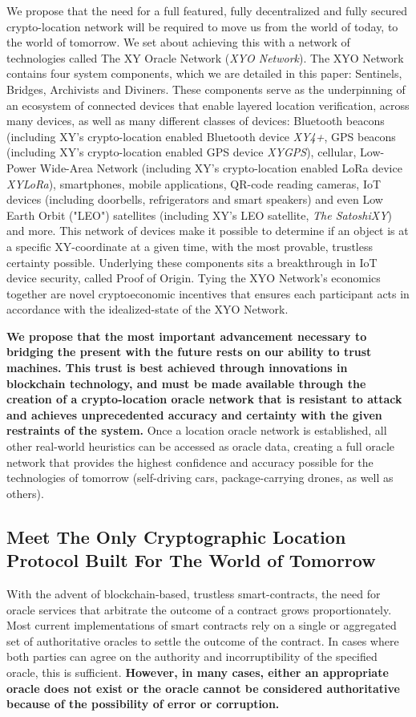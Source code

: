 \documentclass{article}
\begin{document}
We propose that the need for a full featured, fully decentralized and fully secured crypto-location network will be required to move us from the world of today, to the world of tomorrow. We set about achieving this with a network of technologies called The XY Oracle Network (\textit{XYO Network}). The XYO Network contains four system components, which we are detailed in this paper: Sentinels, Bridges, Archivists and Diviners. These components serve as the underpinning of an ecosystem of connected devices that enable layered location verification, across many devices, as well as many different classes of devices: Bluetooth beacons (including XY's crypto-location enabled Bluetooth device \textit{XY4+}, GPS beacons (including XY's crypto-location enabled GPS device \textit{XYGPS}), cellular, Low-Power Wide-Area Network (including XY's crypto-location enabled LoRa device \textit{XYLoRa}), smartphones, mobile applications, QR-code reading cameras, IoT devices (including doorbells, refrigerators and smart speakers) and even Low Earth Orbit ("LEO") satellites (including XY's LEO satellite, \textit{The SatoshiXY}) and more. This network of devices make it possible to determine if an object is at a specific XY-coordinate at a given time, with the most provable, trustless certainty possible. Underlying these components sits a breakthrough in IoT device security, called Proof of Origin. Tying the XYO Network's economics together are novel cryptoeconomic incentives that ensures each participant acts in accordance with the idealized-state of the XYO Network.

\textbf{We propose that the most important advancement necessary to bridging the present with the future rests on our ability to trust machines. This trust is best achieved through innovations in blockchain technology, and must be made available through the creation of a crypto-location \gls{oracle} network that is resistant to attack and achieves unprecedented \gls{accuracy} and \gls{certainty} with the given restraints of the system.} Once a location oracle network is established, all other real-world \glspl{heuristic} can be accessed as oracle data, creating a full oracle network that provides the highest confidence and accuracy possible for the technologies of tomorrow (self-driving cars, package-carrying drones, as well as others).

\subsection {Meet The Only Cryptographic Location Protocol Built For The World of Tomorrow}
With the advent of blockchain-based, trustless \glspl{smart-contract}, the need for \gls{oracle} services that arbitrate the outcome of a contract grows proportionately. Most current implementations of smart contracts rely on a single or aggregated set of authoritative oracles to settle the outcome of the contract. In cases where both parties can agree on the authority and incorruptibility of the specified oracle, this is sufficient. \textbf{However, in many cases, either an appropriate oracle does not exist or the oracle cannot be considered authoritative because of the possibility of error or corruption.}
\end{document}
